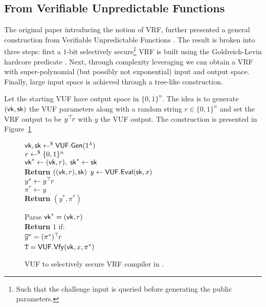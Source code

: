 \subsection{From Verifiable Unpredictable Functions}

The original paper \cite{FOCS:MicRabVad99} introducing the notion of VRF, further presented a general construction from Verifiable Unpredictable Functions .
The result is broken into three steps: first a $1$-bit selectively secure\footnote{Such that the challenge input is queried before generating the public parameters.} VRF is built using the Goldreich-Levin hardcore predicate \cite{STOC:GolLev89}.
Next, through complexity leveraging we can obtain a VRF with super-polynomial (but possibly not exponential) input and output space.
Finally, large input space is achieved through a tree-like construction.

Let the starting VUF have output space in $\{0,1\}^n$.
The idea is to generate $(\vk, \sk)$ the VUF parameters along with a random string $r \in \{0,1\}^n$ and set the VRF output to be $y^\top\hspace{-.1em} r$ with $y$ the VUF output.
The construction is presented in Figure~\ref{prot:MRV99:sel_sec_vrf_from_vuf}

\begin{figure}[htb]
	\centering
	\begin{pcvstack}[center, space=10pt]
	\begin{pchstack}[center, space=10pt]
		{
			$\vk, \sk \rgets \cd{VUF.Gen}(1^\secp)$
				\\
			$r \gets^{\$} \{0,1\}^n$
				\\
			$\vk^\ast \gets (\vk, r), \; \sk^\ast \gets \sk$
				\\
			\textbf{Return} $((\vk, r), \sk)$
		}
		{
			$y \gets \mathsf{VUF.Eval}(\mathsf{sk}, x)$
				\\
			$y^\ast \gets y^\top\hspace{-.1em} r$
				\\
			$\pi^\ast \gets y$
				\\
			\textbf{Return} $(y^\ast, \pi^\ast)$	
		}
	\end{pchstack}
	\begin{pchstack}
		{
			Parse $\vk^\ast = (\vk, r)$
				\\
			\textbf{Return} $1$ if:
				\\
			\t $y^\ast = (\pi^\ast)^\top\hspace{-.1em} r$
				\\
			\t $1 = \cd{VUF.Vfy}(\vk, x, \pi^\ast)$
		}
	\end{pchstack}
	\end{pcvstack}
	\label{prot:MRV99:sel_sec_vrf_from_vuf}
	\caption{VUF to selectively secure VRF compiler in \cite{FOCS:MicRabVad99}.}
\end{figure}

